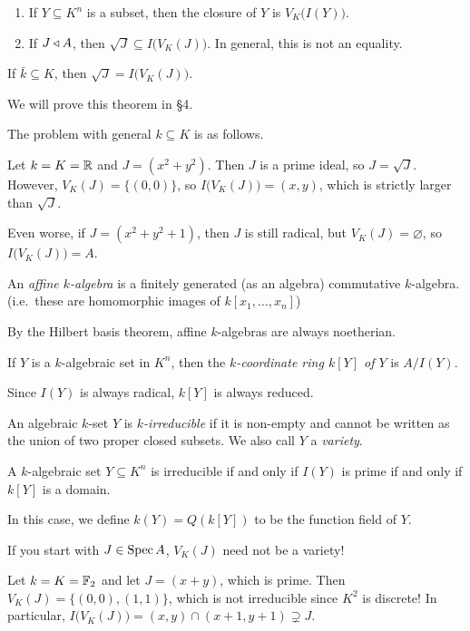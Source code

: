  \begin{enumerate}
   \item If $Y\subseteq K^n$ is a subset, then the closure of $Y$ is
   $V_K\bigl(I(Y)\bigr)$.

   \item If $J\triangleleft A$, then $\sqrt J\subseteq I\bigl(V_K(J)\bigr)$. In general, this is not
   an equality.
 \end{enumerate}
 \begin{theorem}
   If $\bar k\subseteq K$, then $\sqrt J= I\bigl(V_K(J)\bigr)$.
 \end{theorem}
 We will prove this theorem in \S 4.

 The problem with general $k\subseteq K$ is as follows.
 \begin{example}
   Let $k=K=\mathbb{R}$ and $J=(x^2+y^2)$. Then $J$ is a prime ideal, so $J=\sqrt J$. However,
   $V_K(J)=\{(0,0)\}$, so $I\bigl(V_K(J)\bigr)=(x,y)$, which is strictly larger than
   $\sqrt J$.

   Even worse, if $J=(x^2+y^2+1)$, then $J$ is still radical, but $V_K(J)=\varnothing$,
   so $I\bigl(V_K(J)\bigr)=A$.
 \end{example}
 \begin{definition}
   An \emph{affine $k$-algebra} is a finitely generated (as an algebra) commutative
   $k$-algebra. (i.e.\ these are homomorphic images of $k[x_1,\dots, x_n]$)
 \end{definition}
 By the Hilbert basis theorem, affine $k$-algebras are always noetherian.
 \begin{definition}
   If $Y$ is a $k$-algebraic set in $K^n$, then the \emph{$k$-coordinate ring $k[Y]$ of
   $Y$} is $A/I(Y)$.
 \end{definition}
 Since $I(Y)$ is always radical, $k[Y]$ is always reduced.
 \begin{definition}
   An algebraic $k$-set $Y$ is \emph{$k$-irreducible} if it is non-empty and cannot be
   written as the union of two proper closed subsets. We also call $Y$ a \emph{variety}.
 \end{definition}
 \begin{proposition}
   A $k$-algebraic set $Y\subseteq K^n$ is irreducible if and only if $I(Y)$ is prime if
   and only if $k[Y]$ is a domain.
 \end{proposition}
 In this case, we define $k(Y)=Q(k[Y])$ to be the function field of $Y$.
 \begin{warning}
   If you start with $J\in \operatorname{Spec} A$, $V_K(J)$ need not be a variety!
 \begin{example}
   Let $k=K=\mathbb{F}_2$ and let $J=(x+y)$, which is prime. Then $V_K(J)=\{(0,0),(1,1)\}$,
   which is not irreducible since $K^2$ is discrete! In particular,
   $I\bigl(V_K(J)\bigr)=(x,y)\cap (x+1,y+1)\supsetneq J$.
 \end{example}
 \end{warning}

